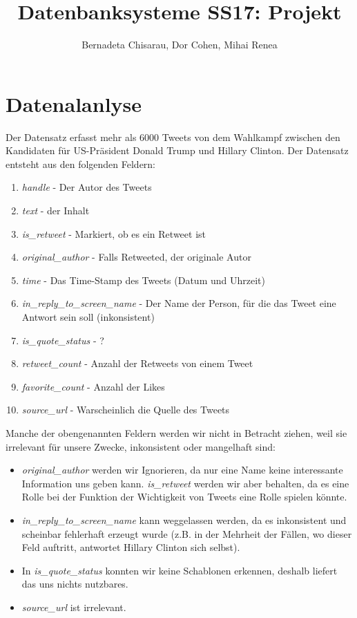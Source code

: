 \documentclass[paper=a4, english, ngerman, romanian]{scrartcl}
\title{Datenbanksysteme SS17: Projekt}
\author{Bernadeta Chisarau, Dor Cohen, Mihai Renea}
\begin{document}
	\maketitle
	
	\pagebreak
	
	\section{Datenalanlyse}
		Der Datensatz erfasst mehr als 6000 Tweets von dem Wahlkampf zwischen den Kandidaten für US-Präsident Donald Trump und Hillary Clinton. Der Datensatz entsteht aus den folgenden Feldern:
		\begin{enumerate}
		\item \textit{handle} - Der Autor des Tweets
		\item \textit{text} - der Inhalt
		\item \textit{is\_retweet} - Markiert, ob es ein Retweet ist
		\item \textit{original\_author} - Falls Retweeted, der originale Autor
		\item \textit{time} - Das Time-Stamp des Tweets (Datum und Uhrzeit)
		\item \textit{in\_reply\_to\_screen\_name} - Der Name der Person, für die das Tweet eine Antwort sein soll (inkonsistent)
		\item \textit{is\_quote\_status} - ?
		\item \textit{retweet\_count} - Anzahl der Retweets von einem Tweet
		\item \textit{favorite\_count} - Anzahl der Likes
		\item \textit{source\_url} - Warscheinlich die Quelle des Tweets
		\end{enumerate}
		
		Manche der obengenannten Feldern werden wir nicht in Betracht ziehen, weil sie irrelevant für unsere Zwecke, inkonsistent oder mangelhaft sind:
		
		\begin{itemize}
		\item \textit{original\_author} werden wir Ignorieren, da nur eine Name keine interessante Information uns geben kann. \textit{is\_retweet} werden wir aber behalten, da es eine Rolle bei der Funktion der Wichtigkeit von Tweets eine Rolle spielen könnte.
		\item \textit{in\_reply\_to\_screen\_name} kann weggelassen werden, da es inkonsistent und scheinbar fehlerhaft erzeugt wurde (z.B. in der Mehrheit der Fällen, wo dieser Feld auftritt, antwortet Hillary Clinton sich selbst).
		\item  In \textit{is\_quote\_status} konnten wir keine Schablonen erkennen, deshalb liefert das uns nichts nutzbares.
		\item \textit{source\_url} ist irrelevant.
		\end{itemize}
		
\end{document}
